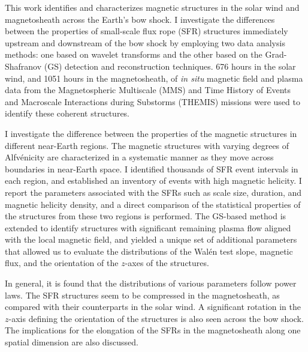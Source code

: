 
This work identifies and characterizes magnetic structures in the solar wind and magnetosheath across the Earth's bow shock. I investigate the differences between the properties of small-scale flux rope (SFR) structures immediately upstream and downstream of the bow shock by employing two data analysis methods: one based on wavelet transforms and the other based on the Grad-Shafranov (GS) detection and reconstruction techniques. 676 hours in the solar wind, and 1051 hours in the magnetosheath, of \textit{in situ} magnetic field and plasma data from the Magnetospheric Multiscale (MMS) and Time History of Events and Macroscale Interactions during Substorms (THEMIS) missions were used to identify these coherent structures.

I investigate the difference between the properties of the magnetic structures in different near-Earth regions. The magnetic structures with varying degrees of Alfv\'enicity are characterized in a systematic manner as they move across boundaries in near-Earth space. I identified thousands of SFR event intervals in each region, and established an inventory of events with high magnetic helicity. I report the parameters associated with the SFRs such as scale size, duration, and magnetic helicity density, and a direct comparison of the statistical properties of the structures from these two regions is performed. The GS-based method is extended to identify structures with significant remaining plasma flow aligned with the local magnetic field, and yielded a unique set of additional parameters that allowed us to evaluate the distributions of the Wal\'en test slope, magnetic flux, and the orientation of the $z$-axes of the structures.

In general, it is found that the distributions of various parameters follow power laws. The SFR structures seem to be compressed in the magnetosheath, as compared with their counterparts in the solar wind. A significant rotation in the $z$-axis defining the orientation of the structures is also seen across the bow shock. The implications for the elongation of the SFRs in the magnetosheath along one spatial dimension are also discussed. 

\clearpage

